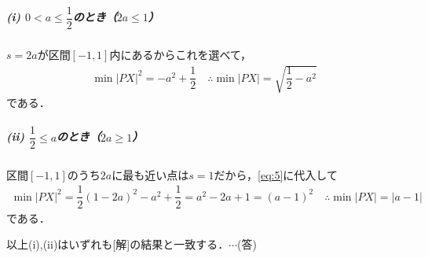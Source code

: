 \documentclass[../../main.tex]{subfiles}
\begin{document}
\subparagraph{(i) $0<a\le\dfrac{1}{2}$のとき（$2a\le1$）}

$s=2a$が区間$[-1,1]$内にあるからこれを選べて，
\begin{align}
  \min|PX|^2=-a^2+\dfrac{1}{2} \quad \therefore \min|PX|=\sqrt{\dfrac{1}{2}-a^2}
\end{align}
である．

\subparagraph{(ii) $\dfrac{1}{2}\le a$のとき（$2a\ge1$）}

区間$[-1,1]$のうち$2a$に最も近い点は$s=1$だから，\cref{eq:5}に代入して
\begin{align}
  \min|PX|^2=\dfrac{1}{2}(1-2a)^2-a^2+\dfrac{1}{2}=a^2-2a+1=(a-1)^2 \quad \therefore \min|PX|=|a-1|
\end{align}
である．

以上(i),(ii)はいずれも[解]の結果と一致する．$\cdots$(答)
\end{document}
